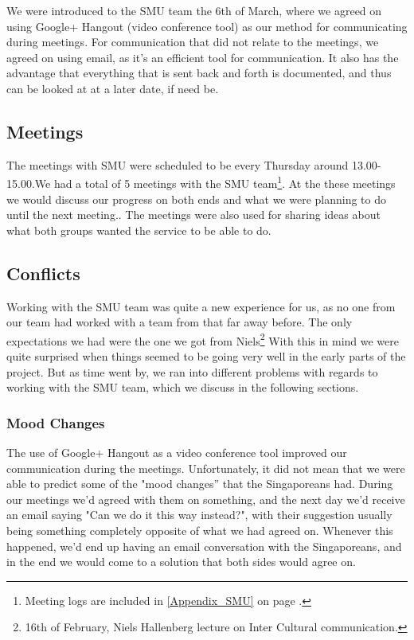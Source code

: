 We were introduced to the SMU team the 6th of March, where we agreed on using Google+ Hangout (video conference tool) as our method for communicating during meetings. For communication that did not relate to the meetings, we agreed on using email, as it's an efficient tool for communication. It also has the advantage that everything that is sent back and forth is documented, and thus can be looked at at a later date, if need be.

\subsection{Meetings}
\label{Collaboration_SMU_Meetings}
The meetings with SMU were scheduled to be every Thursday around 13.00-15.00.We had a total of 5 meetings with the SMU team\footnote{Meeting logs are included in \ref{Appendix_SMU} on page \pageref{Appendix_SMU}.}. At the these meetings we would discuss our progress on both ends and what we were planning to do until the next meeting.. The meetings were also used for sharing ideas about what both groups wanted the service to be able to do.

\subsection{Conflicts}
\label{Collaboration_SMU_Conflicts}
Working with the SMU team was quite a new experience for us, as no one from our team had worked with a team from that far away before. The only expectations we had were the one we got from Niels\footnote{16th of February, Niels Hallenberg lecture on Inter Cultural communication.} With this in mind we were quite surprised when things seemed to be going very well in the early parts of the project. But as time went by, we ran into different problems with regards to working with the SMU team, which we discuss in the following sections.

\subsubsection{Mood Changes}
\label{Collaboration_SMU_Conflicts_Mood}
The use of Google+ Hangout as a video conference tool improved our communication during the meetings. Unfortunately, it did not mean that we were able to predict some of the "mood changes'' that the Singaporeans had. During our meetings we'd agreed with them on something, and the next day we'd receive an email saying "Can we do it this way instead?", with their suggestion usually being something completely opposite of what we had agreed on. Whenever this happened, we'd end up having an email conversation with the Singaporeans, and in the end we would come to a solution that both sides would agree on.

